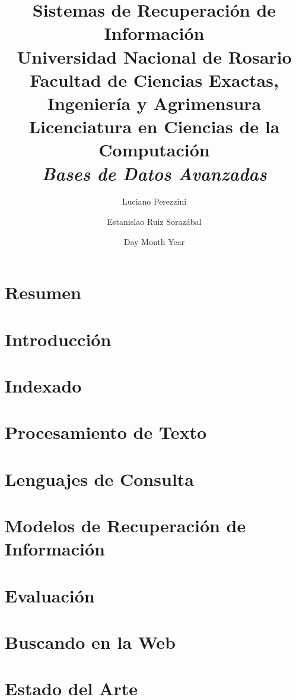 \documentclass[11pt, spanish]{report}
\title{
	{\huge Sistemas de Recuperación de Información}\\
	{\Large Universidad Nacional de Rosario}\\
	{\large Facultad de Ciencias Exactas, Ingeniería y Agrimensura}\\
	{\small Licenciatura en Ciencias de la Computación}\\
	{\small {\itshape Bases de Datos Avanzadas}}
}
\author{Luciano Perezzini \and Estanislao Ruiz Sorazábal}
\date{Day Month Year}
\begin{document}
	\maketitle
	
	\chapter*{Resumen}
		
				
	\tableofcontents
	
	\chapter{Introducción}
		
		
	\chapter{Indexado}
		
		
	\chapter{Procesamiento de Texto}
		
		
	\chapter{Lenguajes de Consulta}
		
		
	\chapter{Modelos de Recuperación de Información}
		
		
	\chapter{Evaluación}
		
		
	\chapter{Buscando en la Web}
		

	\chapter{Estado del Arte}
		
\end{document}
